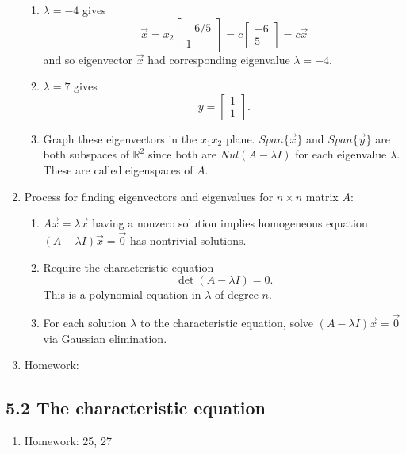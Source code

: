 \documentclass{article}
\begin{document}
\begin{enumerate}
\begin{enumerate}
\item $\lambda = -4$ gives
\[
\vec{x} = x_2 \left[
\begin{array}{c}
-6/5 \\ 1
\end{array}
\right] = 
c \left[
\begin{array}{c}
-6 \\ 5
\end{array}
\right] = c\vec{x}
\]
and so eigenvector $\vec{x}$ had corresponding eigenvalue $\lambda = -4$.

\item $\lambda = 7$ gives
\[
y = \left[
\begin{array}{c}
1 \\ 1
\end{array}
\right].
\]

\item Graph these eigenvectors in the $x_1 x_2$ plane. $Span\{ \vec{x} \}$ and $Span \{ \vec{y} \}$ are both subspaces of $\mathbb{R}^2$ since both are $Nul(A-\lambda I)$ for each eigenvalue $\lambda$. These are called eigenspaces of $A$. 
\end{enumerate}

\item Process for finding eigenvectors and eigenvalues for $n \times n$ matrix $A$:
\begin{enumerate}
\item $A\vec{x} = \lambda \vec{x}$ having a nonzero solution implies homogeneous equation $(A-\lambda I)\vec{x} = \vec{0}$ has nontrivial solutions.
\item Require the characteristic equation
\[
\det(A-\lambda I) = 0.
\]
This is a polynomial equation in $\lambda$ of degree $n$.
\item For each solution $\lambda$ to the characteristic equation, solve  $(A-\lambda I)\vec{x} = \vec{0}$ via Gaussian elimination.
\end{enumerate}

\item Homework: 

\end{enumerate}

\subsection{5.2 The characteristic equation}

\begin{enumerate}

\item Homework: 25, 27

\end{enumerate}
\end{document}
